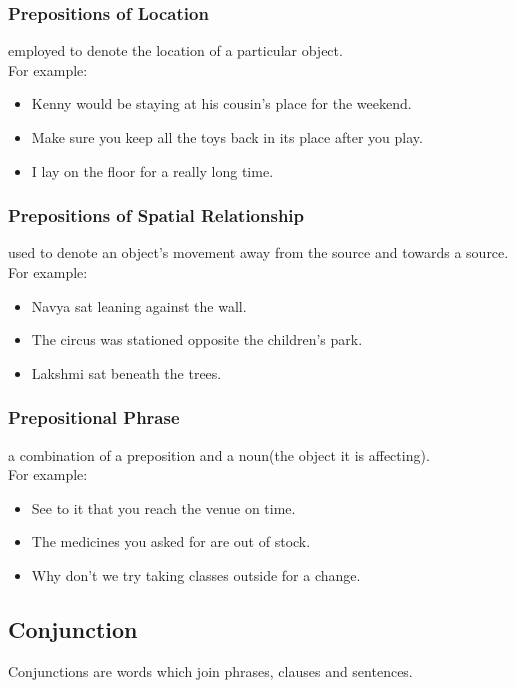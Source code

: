 \subsubsection{Prepositions of Location \cite{byjus-english-prepositions}}
employed to denote the location of a particular object.\\
For example:
\begin{itemize}
    \item Kenny would be staying at his cousin’s place for the weekend.
    \item Make sure you keep all the toys back in its place after you play.
    \item I lay on the floor for a really long time.
\end{itemize}

\subsubsection{Prepositions of Spatial Relationship \cite{byjus-english-prepositions}}
used to denote an object’s movement away from the source and towards a source.\\
For example:
\begin{itemize}
    \item Navya sat leaning against the wall.
    \item The circus was stationed opposite the children’s park.
    \item Lakshmi sat beneath the trees.
\end{itemize}

\subsubsection{Prepositional Phrase \cite{byjus-english-prepositions}} 
a combination of a preposition and a noun(the object it is affecting).\\
For example:
\begin{itemize}
    \item See to it that you reach the venue on time.
    \item The medicines you asked for are out of stock.
    \item Why don’t we try taking classes outside for a change.
\end{itemize}




\subsection{Conjunction \cite{wiki-Conjunction}}\label{Conjunction}
Conjunctions are words which join phrases, clauses and sentences.


